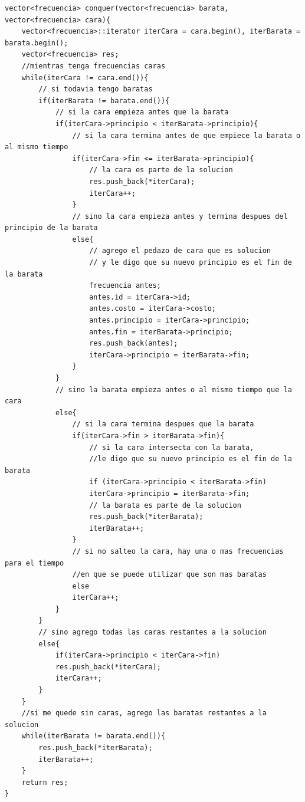 	
		\begin{codesnippet}
	\begin{verbatim}
vector<frecuencia> conquer(vector<frecuencia> barata, vector<frecuencia> cara){
    vector<frecuencia>::iterator iterCara = cara.begin(), iterBarata = barata.begin();
    vector<frecuencia> res;
    //mientras tenga frecuencias caras
    while(iterCara != cara.end()){
        // si todavia tengo baratas
        if(iterBarata != barata.end()){
            // si la cara empieza antes que la barata
            if(iterCara->principio < iterBarata->principio){
                // si la cara termina antes de que empiece la barata o al mismo tiempo
                if(iterCara->fin <= iterBarata->principio){
                    // la cara es parte de la solucion
                    res.push_back(*iterCara);
                    iterCara++;
                }
                // sino la cara empieza antes y termina despues del principio de la barata
                else{
                    // agrego el pedazo de cara que es solucion 
                    // y le digo que su nuevo principio es el fin de la barata
                    frecuencia antes;
                    antes.id = iterCara->id;
                    antes.costo = iterCara->costo;
                    antes.principio = iterCara->principio;
                    antes.fin = iterBarata->principio;
                    res.push_back(antes);
                    iterCara->principio = iterBarata->fin;
                }
            }
            // sino la barata empieza antes o al mismo tiempo que la cara
            else{
                // si la cara termina despues que la barata
                if(iterCara->fin > iterBarata->fin){
                    // si la cara intersecta con la barata, 
                    //le digo que su nuevo principio es el fin de la barata
                    if (iterCara->principio < iterBarata->fin)
                    iterCara->principio = iterBarata->fin;
                    // la barata es parte de la solucion
                    res.push_back(*iterBarata);
                    iterBarata++;
                }
                // si no salteo la cara, hay una o mas frecuencias para el tiempo 
                //en que se puede utilizar que son mas baratas
                else
                iterCara++;
            }
        }
        // sino agrego todas las caras restantes a la solucion
        else{
            if(iterCara->principio < iterCara->fin)
            res.push_back(*iterCara);
            iterCara++;
        }
    }
    //si me quede sin caras, agrego las baratas restantes a la solucion
    while(iterBarata != barata.end()){
        res.push_back(*iterBarata);
        iterBarata++;
    }
    return res;
}
	\end{verbatim}
	\end{codesnippet}
		
